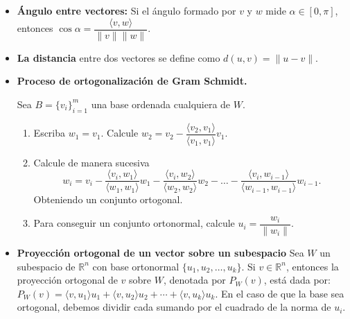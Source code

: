 \documentclass[a4paper]{article}
\theoremstyle{exampstyle}
\theoremstyle{definition}
\newtheorem{defin}[thm]{Definici\'on}
\begin{document}
\begin{itemize}


    \item \textbf{\'Angulo entre vectores:} Si el ángulo formado por $v$ y $w$ mide $\alpha\in [0,\pi ]$, entonces $ \cos \alpha =\dfrac{\langle v, w\rangle}{\|v\|\| w\|}.$

    \item \textbf{La distancia} entre dos vectores se define como $d(u,v)=\|u-v\|.$

    \item \textbf{Proceso de ortogonalizaci\'on de Gram Schmidt.}

Sea $B = \{v_i\}_{i=1}^m $ una base ordenada cualquiera de $W $.
\begin{enumerate}
\item Escriba $w_1 = v_1$. Calcule $w_2 = v_2 - \dfrac{\langle v_2,v_1\rangle}{\langle v_1,v_1\rangle}v_1$.
\item Calcule de manera sucesiva
\[w_i=v_i-\dfrac{\langle v_i,w_1\rangle}{\langle w_1,w_1\rangle}w_1-\dfrac{\langle v_i,w_2\rangle}{\langle w_2,w_2\rangle}w_2-\dots-\dfrac{\langle v_i,w_{i-1}\rangle}{\langle w_{i-1},w_{i-1}\rangle}w_{i-1}.\]
Obteniendo un conjunto ortogonal.
\item Para conseguir un conjunto ortonormal, calcule $u_i=\dfrac{w_i}{\|w_i\|}$.
\end{enumerate}

    \item \textbf{Proyección ortogonal de un vector sobre un subespacio}
Sea $W$ un subespacio de $\mathbb{R}^n$ con base ortonormal $\{ u_1,u_2, \dots , u_k  \}$. Si $v \in \mathbb{R}^n$, entonces la proyección ortogonal de $v$ sobre $W$, denotada por $P_W(v)$, está dada por:
$P_W( v) = \langle v , u_1\rangle u_1 + \langle v , u_2\rangle u_2 + \cdots + \langle v , u_k\rangle u_k$. En el caso de que la base sea ortogonal, debemos dividir cada sumando por el cuadrado de la norma de $u_i$.
\end{itemize}
\end{document}
